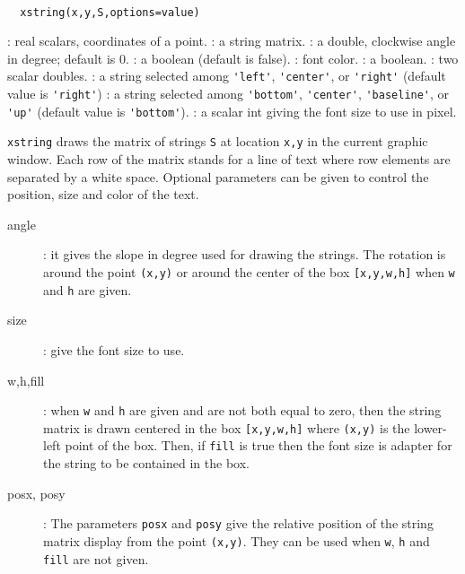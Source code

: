 
\begin{mandesc}
  \\
\end{mandesc}
\begin{calling_sequence}
\begin{verbatim}
  xstring(x,y,S,options=value)
\end{verbatim}
\end{calling_sequence}
\begin{parameters}
  \begin{varlist}
    : real scalars, coordinates of a point.
    : a string matrix.
    : a double, clockwise angle in degree; default is 0.
    : a boolean (default is false).
    : font color.
    : a boolean.
    : two scalar doubles.
    : a string selected among \verb!'left'!, \verb!'center'!, or \verb!'right'! (default value is \verb!'right'!)
    : a string selected among \verb!'bottom'!, \verb!'center'!, \verb!'baseline'!, or \verb!'up'! (default value is \verb!'bottom'!).
    : a scalar int giving the font size to use in pixel.
  \end{varlist}
\end{parameters}

\begin{mandescription}
  \verb!xstring! draws the matrix of strings \verb!S! at location \verb!x,y!
  in the current graphic window. Each row of the matrix
  stands for a line of text where row elements are separated by a white space.
  Optional parameters can be given to control the position, size and color of the
  text.

  \begin{description}
  \item[angle]: it gives the slope in degree used for drawing the strings.
    The rotation is around the point \verb!(x,y)! or around the center of the box \verb![x,y,w,h]!
    when  \verb!w! and \verb!h! are given.
  \item[size]: give the font size to use.
  \item[w,h,fill]: when \verb!w! and \verb!h! are given and are not both equal to zero,
    then the string matrix is drawn centered in the box \verb![x,y,w,h]! where
    \verb!(x,y)! is the lower-left point of the box. Then, if \verb!fill! is true
    then the font size is adapter for the string to be contained in the box.
  \item[posx, posy]: The parameters \verb!posx! and \verb!posy! give the relative
    position of the string matrix display from the point \verb!(x,y)!. They can be used
    when \verb!w!, \verb!h! and \verb!fill! are not given.
  \end{description}
\end{mandescription}

